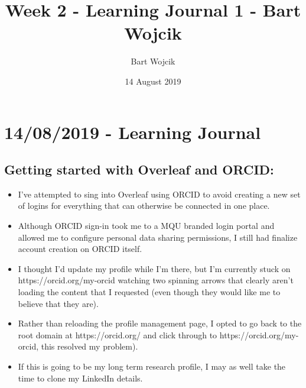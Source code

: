 \documentclass{article}
\title{Week 2 - Learning Journal 1 - Bart Wojcik}
\author{Bart Wojcik}
\date{14 August 2019}
\begin{document}
\maketitle

\section{14/08/2019 - Learning Journal}
\subsection{Getting started with Overleaf and ORCID:}
\medskip
\begin{itemize}
    \item I've attempted to sing into Overleaf using ORCID to avoid creating a new set of logins for everything that can otherwise be connected in one place.
    \item Although ORCID sign-in took me to a MQU branded login portal and allowed me to configure personal data sharing permissions, I still had finalize account creation on ORCID itself. 
    \item I thought I'd update my profile while I'm there, but I'm currently stuck on https://orcid.org/my-orcid watching two spinning arrows that clearly aren't loading the content that I requested (even though they would like me to believe that they are). 
    \item Rather than reloading the profile management page, I opted to go back to the root domain at https://orcid.org/ and click through to https://orcid.org/my-orcid, this resolved my problem). 
    \item If this is going to be my long term research profile, I may as well take the time to clone my LinkedIn details. 
\end{itemize}
\end{document}

